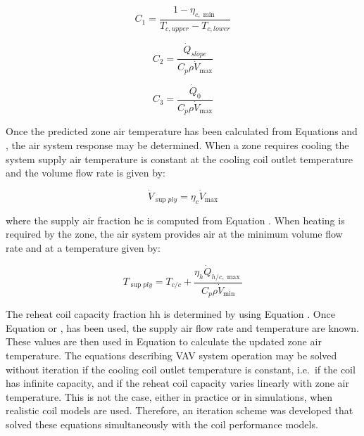 \begin{equation}
{C_1} = \frac{{1 - {\eta_{c,\min }}}}{{{T_{c,upper}} - {T_{c,lower}}}}
\end{equation}

\begin{equation}
{C_2} = \frac{{{{\dot Q}_{slope}}}}{{{C_p}\rho {{\dot V}_{\max }}}}
\end{equation}

\begin{equation}
{C_3} = \frac{{{{\dot Q}_0}}}{{{C_p}\rho {{\dot V}_{\max }}}}
\end{equation}

Once the predicted zone air temperature has been calculated from Equations and , the air system response may be determined. When a zone requires cooling the system supply air temperature is constant at the cooling coil outlet temperature and the volume flow rate is given by:

\begin{equation}
{\dot V_{\sup ply}} = {\eta_c}{\dot V_{\max }}
\end{equation}

where the supply air fraction hc is computed from Equation . When heating is required by the zone, the air system provides air at the minimum volume flow rate and at a temperature given by:

\begin{equation}
{T_{\sup ply}} = {T_{c/c}} + \frac{{{\eta_h}{{\dot Q}_{h/c,\max }}}}{{{C_p}\rho {{\dot V}_{\min }}}}
\end{equation}

The reheat coil capacity fraction hh is determined by using Equation . Once Equation or , has been used, the supply air flow rate and temperature are known. These values are then used in Equation to calculate the updated zone air temperature. The equations describing VAV system operation may be solved without iteration if the cooling coil outlet temperature is constant, i.e.~if the coil has infinite capacity, and if the reheat coil capacity varies linearly with zone air temperature. This is not the case, either in practice or in simulations, when realistic coil models are used. Therefore, an iteration scheme was developed that solved these equations simultaneously with the coil performance models.
